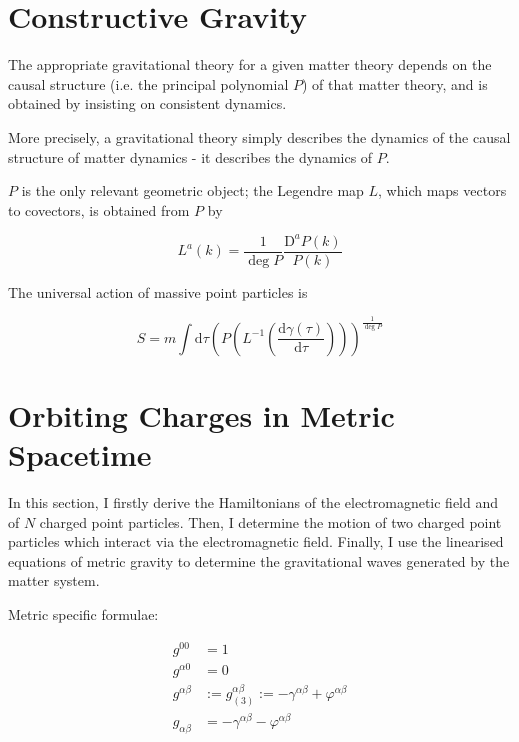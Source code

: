 \documentclass[11pt]{article}
\begin{document}
\section{Constructive Gravity}

The appropriate gravitational theory for a given matter theory depends on the causal structure (i.e. the principal polynomial $P$) of that matter theory, and is obtained by insisting on consistent dynamics. 

More precisely, a gravitational theory simply describes the dynamics of the causal structure of matter dynamics - it describes the dynamics of $P$.

$P$ is the only relevant geometric object; the Legendre map $L$, which maps vectors to covectors, is obtained from $P$ by

\begin{equation}
	L^a \left( k \right) = \frac{1}{\deg{P}}\frac{\mathrm{D}^a P \left( k \right)}{P\left(k\right)}
\end{equation}

The universal action of massive point particles is

\begin{equation}
	S = m \int \mathrm{d}\tau \left(P \left( L^{-1} \left( \frac{\mathrm{d} \gamma\left(\tau \right)}{\mathrm{d}\tau} \right) \right)\right)^{\frac{1}{\deg{P}}}
\end{equation}

\section{Orbiting Charges in Metric Spacetime}

In this section, I firstly derive the Hamiltonians of the electromagnetic field and of $N$ charged point particles. Then, I determine the motion of two charged point particles which interact via the electromagnetic field. Finally, I use the linearised equations of metric gravity to determine the gravitational waves generated by the matter system. 

Metric specific formulae:

\begin{align}
	g^{00} &= 1 \\
	g^{\alpha 0} &= 0 \\
	g^{\alpha \beta} &:= g_{(3)}^{\alpha \beta}  := - \gamma^{\alpha \beta} + \varphi^{\alpha \beta}\\
	g_{\alpha \beta} &= - \gamma^{\alpha \beta} - \varphi^{\alpha \beta}
\end{align}
\end{document}
